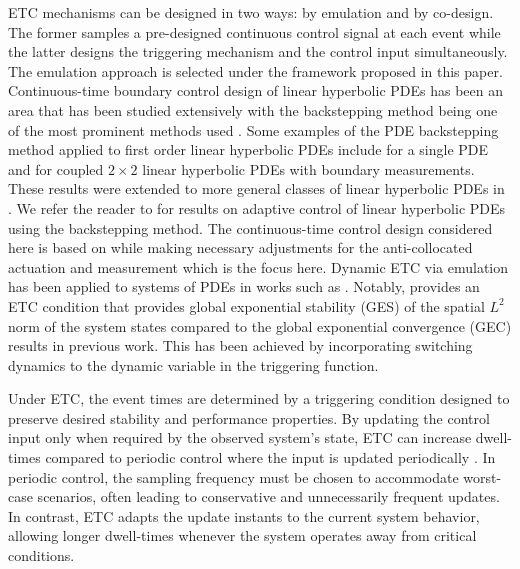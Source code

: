 \documentclass[letterpaper, 10 pt, conference]{ieeeconf}
\begin{document}
ETC mechanisms can be designed in two ways: by emulation and by co-design. The former samples a pre-designed continuous control signal at each event while the latter designs the triggering mechanism and the control input simultaneously. The emulation approach is selected under the framework proposed in this paper. Continuous-time boundary control design of linear hyperbolic PDEs has been an area that has been studied extensively with the backstepping method being one of the most prominent methods used \cite{vazquez2026_backstepping_survery}. Some examples of the PDE backstepping method applied to first order linear hyperbolic PDEs include \cite{krstic2008_1xhyperbolic} for a single PDE and \cite{vazquez2011_2x2hyperbolic} for coupled $2\times2$ linear hyperbolic PDEs with boundary measurements. These results were extended to more general classes of  linear hyperbolic PDEs in \cite{meglio2013,hu2016}. We refer the reader to \cite{anfinsen2019adaptive} for results on adaptive control of linear hyperbolic PDEs using the backstepping method. The continuous-time control design considered here is based on \cite{vazquez2011_2x2hyperbolic} while making necessary adjustments for the anti-collocated actuation and measurement which is the focus here. Dynamic ETC via emulation has been applied to systems of PDEs in works such as \cite{rathnayake2021observer,espitia2020observer,bhathiya2026_etc_stability}. Notably, \cite{bhathiya2026_etc_stability} provides an ETC condition that provides global exponential stability (GES) of the spatial $L^2$ norm of the system states compared to the global exponential convergence (GEC) results in previous work. This has been achieved by incorporating switching dynamics to the dynamic variable in the triggering function.

Under ETC, the event times are determined by a triggering condition designed to preserve desired stability and performance properties. By updating the control input only when required by the observed system's state, ETC can increase dwell-times compared to periodic control where the input is updated periodically \cite{heemels2012introduction}. In periodic control, the sampling frequency must be chosen to accommodate worst-case scenarios, often leading to conservative and unnecessarily frequent updates. In contrast, ETC adapts the update instants to the current system behavior, allowing longer dwell-times whenever the system operates away from critical conditions. 
\end{document}
